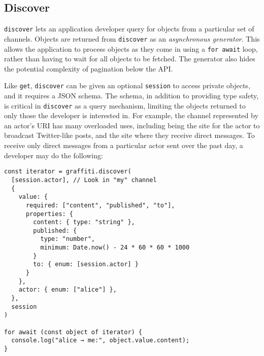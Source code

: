 

\subsection{Discover}

\texttt{discover} lets an application developer query for objects
from a particular set of channels.
Objects are returned from \texttt{discover} as an \emph{asynchronous generator}.
This allows the application to process objects as they come in
using a \texttt{for await} loop, rather than having to wait for all objects
to be fetched. The generator also hides the potential complexity of
pagination below the API.

Like \texttt{get}, \texttt{discover} can be given an optional \texttt{session}
to access private objects, and it requires a JSON schema.
The schema,
in addition to providing type safety, is critical in \texttt{discover}
as a query mechanism, limiting the objects returned to only those the developer is interested in.
For example, the channel represented by an actor's URI has many overloaded uses,
including being the site for the actor to broadcast Twitter-like posts,
and the site where they receive direct messages.
To receive only direct messages from a particular actor
sent over the past day, a developer may do the following:

\begin{verbatim}
const iterator = graffiti.discover(
  [session.actor], // Look in "my" channel
  {
    value: {
      required: ["content", "published", "to"],
      properties: {
        content: { type: "string" },
        published: {
          type: "number",
          minimum: Date.now() - 24 * 60 * 60 * 1000
        }
        to: { enum: [session.actor] }
      }
    },
    actor: { enum: ["alice"] },
  },
  session
)

for await (const object of iterator) {
  console.log("alice → me:", object.value.content);
}
\end{verbatim}

